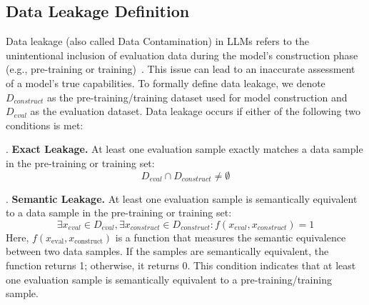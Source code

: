 

\subsection{Data Leakage Definition}






Data leakage (also called Data Contamination) in LLMs refers to the unintentional inclusion of evaluation data during the model's construction phase (e.g., pre-training or training)~\cite{balloccu2024leak}. This issue can lead to an inaccurate assessment of a model's true capabilities. To formally define data leakage, we denote \( D_{construct} \) as the pre-training/training dataset used for model construction and \( D_{eval} \) as the evaluation dataset. Data leakage occurs if either of the following two conditions is met:




\vspace{0.1cm}
. \textbf{Exact Leakage.} At least one evaluation sample exactly matches a data sample in the pre-training or training set: \[D_{eval} \cap D_{construct} \neq \emptyset \]  




\vspace{0.1cm}
. \textbf{Semantic Leakage.} At least one evaluation sample is semantically equivalent to a data sample in the pre-training or training set:
\[
   \exists x_{eval} \in D_{eval}, \exists x_{construct} \in D_{construct} \colon
   f(x_{eval}, x_{construct}) = 1
\]
Here, \( f(x_{\text{eval}}, x_{\text{construct}}) \) is a function that measures the semantic equivalence between two data samples. If the samples are semantically equivalent, the function returns 1; otherwise, it returns 0. This condition indicates that at least one evaluation sample is semantically equivalent to a pre-training/training sample. 




